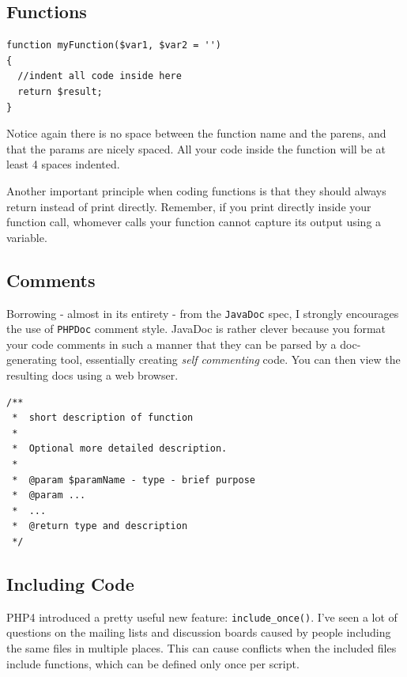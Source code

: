 \documentclass[headexclude,footexclude,12pt,BCOR0pt,DIV15]{scrartcl}
\begin{document}
    \subsection{Functions}

\begin{lstlisting}[stepnumber=0,frame={}]
function myFunction($var1, $var2 = '')
{
  //indent all code inside here
  return $result;
}
\end{lstlisting}

        Notice again there is no space between the function name and the parens, and that the params are nicely
        spaced. All your code inside the function will be at least 4 spaces indented.

        Another important principle when coding functions is that they should always return instead of print directly.
        Remember, if you print directly inside your function call, whomever calls your function cannot capture its
        output using a variable.

    \subsection{Comments}
        Borrowing - almost in its entirety - from the \texttt{JavaDoc} spec, I strongly encourages the use of \texttt{PHPDoc} comment style.
        JavaDoc is rather clever because you format your code comments in such a manner that they can be parsed by a
        doc-generating tool, essentially creating \emph{self commenting} code. You can then view the resulting docs using a web browser.

\begin{lstlisting}[stepnumber=0,frame={}]
/**
 *  short description of function
 *
 *  Optional more detailed description.
 *
 *  @param $paramName - type - brief purpose
 *  @param ...
 *  ...
 *  @return type and description
 */
\end{lstlisting}


    \subsection{Including Code}
        PHP4 introduced a pretty useful new feature: \texttt{include\_once()}. I've seen a lot of questions on the mailing
        lists and discussion boards caused by people including the same files in multiple places. This can cause conflicts
        when the included files include functions, which can be defined only once per script.
\end{document}
